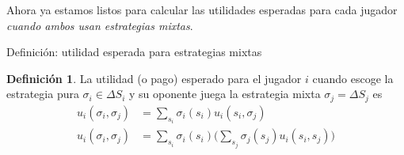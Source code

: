 \documentclass[12pt]{scrartcl}
\theoremstyle{definition}
\newtheorem{defi}{Definición}[section]
\begin{document}
Ahora ya estamos listos para calcular las utilidades esperadas para cada jugador \textit{cuando ambos usan estrategias mixtas}. 
\vspace{1cm}

\begin{mybox}{Definición: utilidad esperada para estrategias mixtas}
    \begin{defi}
        La utilidad (o pago) esperado para el jugador $i$ cuando escoge la estrategia pura $\sigma_i \in \Delta S_i$ y su oponente juega la estrategia mixta $\sigma_{j} = \Delta S_{j}$ es
        \begin{align*}
            u_i(\sigma_i, \sigma_{j}) &= \sum_{s_{i}} \sigma_{i}(s_{i})u_i(s_i,\sigma_{j}) \\
            u_i(\sigma_i, \sigma_{j}) &= \sum_{s_{i}} \sigma_i(s_i)\Bigg ( \sum_{s_{j}} \sigma_{j}(s_{j})u_i(s_i,s_{j}) \Bigg )
        \end{align*} 
    \end{defi}
\end{mybox}
\end{document}
